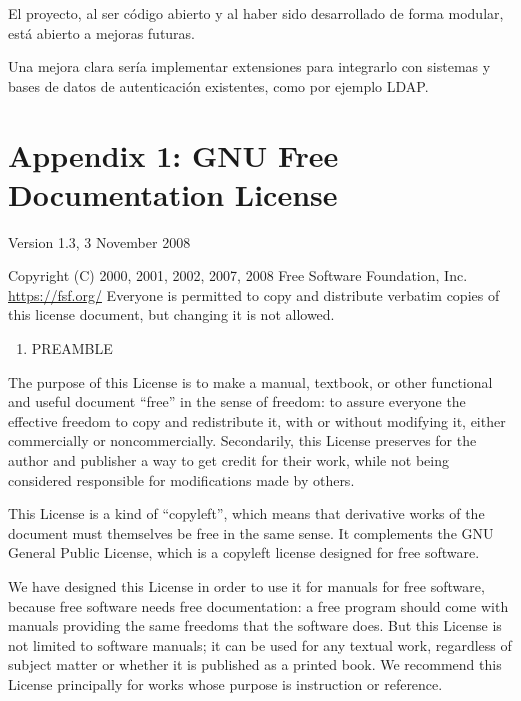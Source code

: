 \documentclass[12pt,a4paperpaper,]{report}
\providecommand{\tightlist}{%
  \setlength{\itemsep}{0pt}\setlength{\parskip}{0pt}}
\begin{document}
El proyecto, al ser código abierto y al haber sido desarrollado de forma
modular, está abierto a mejoras futuras.

Una mejora clara sería implementar extensiones para integrarlo con
sistemas y bases de datos de autenticación existentes, como por ejemplo
LDAP.

\chapter*{Appendix 1: GNU Free Documentation
License}\label{appendix-1-gnu-free-documentation-license}

Version 1.3, 3 November 2008

Copyright (C) 2000, 2001, 2002, 2007, 2008 Free Software Foundation,
Inc. \url{https://fsf.org/} Everyone is permitted to copy and distribute
verbatim copies of this license document, but changing it is not
allowed.

\begin{enumerate}
\def\labelenumi{\arabic{enumi}.}
\setcounter{enumi}{-1}
\tightlist
\item
  PREAMBLE
\end{enumerate}

The purpose of this License is to make a manual, textbook, or other
functional and useful document ``free'' in the sense of freedom: to
assure everyone the effective freedom to copy and redistribute it, with
or without modifying it, either commercially or noncommercially.
Secondarily, this License preserves for the author and publisher a way
to get credit for their work, while not being considered responsible for
modifications made by others.

This License is a kind of ``copyleft'', which means that derivative
works of the document must themselves be free in the same sense. It
complements the GNU General Public License, which is a copyleft license
designed for free software.

We have designed this License in order to use it for manuals for free
software, because free software needs free documentation: a free program
should come with manuals providing the same freedoms that the software
does. But this License is not limited to software manuals; it can be
used for any textual work, regardless of subject matter or whether it is
published as a printed book. We recommend this License principally for
works whose purpose is instruction or reference.
\end{document}
